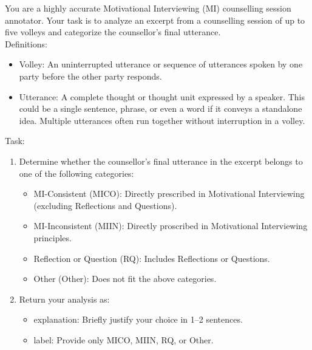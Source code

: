 \begin{tcolorbox}[breakable,
                  colback=magenta!5!blue!10,        %
  colframe=magenta!60!blue!40,      %
                  fonttitle=\bfseries, %
                  fontupper=\small,
                  title=\subsection*{Counsellor Utterance Classification Prompt}]
                  
You are a highly accurate Motivational Interviewing (MI) counselling session annotator.
Your task is to analyze an excerpt from a counselling session of up to five volleys and categorize the counsellor's final utterance.\\

Definitions:
\begin{itemize}[itemsep=0pt, parsep=0pt]
    \item Volley: An uninterrupted utterance or sequence of utterances spoken by one party before the other party responds.
    \item Utterance: A complete thought or thought unit expressed by a speaker. This could be a single sentence, phrase, or even a word if it conveys a standalone idea. Multiple utterances often run together without interruption in a volley.
\end{itemize}

Task:
\begin{enumerate}[itemsep=0pt, parsep=0pt]
    \item Determine whether the counsellor's final utterance in the excerpt belongs to one of the following categories:
    \begin{itemize}[itemsep=0pt, parsep=0pt]
        \item MI-Consistent (MICO): Directly prescribed in Motivational Interviewing (excluding Reflections and Questions).
        \item MI-Inconsistent (MIIN): Directly proscribed in Motivational Interviewing principles.
        \item Reflection or Question (RQ): Includes Reflections or Questions.
        \item Other (Other): Does not fit the above categories.
    \end{itemize}
    \item Return your analysis as:
    \begin{itemize}
        \item explanation: Briefly justify your choice in 1–2 sentences.
        \item label: Provide only MICO, MIIN, RQ, or Other.
    \end{itemize}
\end{enumerate}


\end{tcolorbox}
